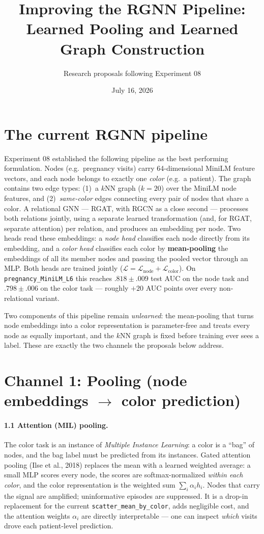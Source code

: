 \documentclass[11pt]{article}
\title{Improving the RGNN Pipeline:\\ Learned Pooling and Learned Graph Construction}
\author{Research proposals following Experiment 08}
\date{July 16, 2026}
\begin{document}
\maketitle

\section*{The current RGNN pipeline}
Experiment 08 established the following pipeline as the best performing formulation. Nodes (e.g.\ pregnancy visits) carry 64-dimensional MiniLM feature vectors, and each node belongs to exactly one \emph{color} (e.g.\ a patient). The graph contains two edge types: (1)~a $k$NN graph ($k{=}20$) over the MiniLM node features, and (2)~\emph{same-color} edges connecting every pair of nodes that share a color. A relational GNN --- RGAT, with RGCN as a close second --- processes both relations jointly, using a separate learned transformation (and, for RGAT, separate attention) per relation, and produces an embedding per node. Two heads read these embeddings: a \emph{node head} classifies each node directly from its embedding, and a \emph{color head} classifies each color by \textbf{mean-pooling} the embeddings of all its member nodes and passing the pooled vector through an MLP. Both heads are trained jointly ($\mathcal{L} = \mathcal{L}_{\text{node}} + \mathcal{L}_{\text{color}}$). On \texttt{pregnancy\_MiniLM\_L6} this reaches $.818 \pm .009$ test AUC on the node task and $.798 \pm .006$ on the color task --- roughly $+20$ AUC points over every non-relational variant.

Two components of this pipeline remain \emph{unlearned}: the mean-pooling that turns node embeddings into a color representation is parameter-free and treats every node as equally important, and the $k$NN graph is fixed before training ever sees a label. These are exactly the two channels the proposals below address.

\section*{Channel 1: Pooling (node embeddings $\to$ color prediction)}

\paragraph{1.1 Attention (MIL) pooling.}
The color task is an instance of \emph{Multiple Instance Learning}: a color is a ``bag'' of nodes, and the bag label must be predicted from its instances. Gated attention pooling (Ilse et al., 2018) replaces the mean with a learned weighted average: a small MLP scores every node, the scores are softmax-normalized \emph{within each color}, and the color representation is the weighted sum $\sum_i \alpha_i h_i$. Nodes that carry the signal are amplified; uninformative episodes are suppressed. It is a drop-in replacement for the current \texttt{scatter\_mean\_by\_color}, adds negligible cost, and the attention weights $\alpha_i$ are directly interpretable --- one can inspect \emph{which} visits drove each patient-level prediction.
\end{document}

